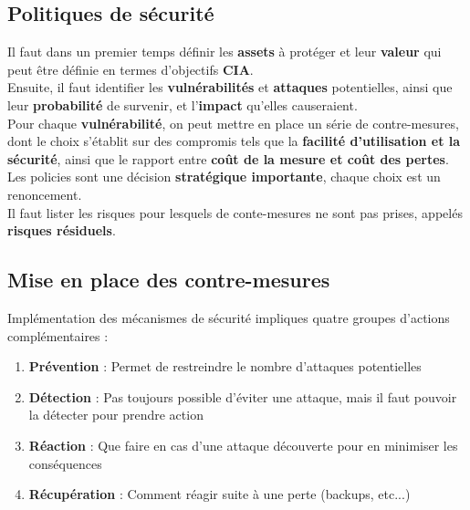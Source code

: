 \documentclass{report}
\begin{document}
		\subsection{Politiques de sécurité}

			Il faut dans un premier temps définir les \textbf{assets} à protéger et leur \textbf{valeur} qui peut être définie en termes d'objectifs \textbf{CIA}.\\

			Ensuite, il faut identifier les \textbf{vulnérabilités} et \textbf{attaques} potentielles, ainsi que leur \textbf{probabilité} de survenir, et l'\textbf{impact} qu'elles causeraient.\\

			Pour chaque \textbf{vulnérabilité}, on peut mettre en place un série de contre-mesures, dont le choix s'établit sur des compromis tels que la \textbf{facilité d'utilisation et la sécurité}, ainsi que le rapport entre \textbf{coût de la mesure et coût des pertes}.\\

			Les policies sont une décision \textbf{stratégique importante}, chaque choix est un renoncement.\\
			Il faut lister les risques pour lesquels de conte-mesures ne sont pas prises, appelés \textbf{risques résiduels}.\\

		\subsection{Mise en place des contre-mesures}

			Implémentation des mécanismes de sécurité impliques quatre groupes d'actions complémentaires : \\

			\begin{enumerate}
				\item \textbf{Prévention} : Permet de restreindre le nombre d'attaques potentielles
				\item \textbf{Détection} : Pas toujours possible d'éviter une attaque, mais il faut pouvoir la détecter pour prendre action
				\item \textbf{Réaction} : Que faire en cas d'une attaque découverte pour en minimiser les conséquences
				\item \textbf{Récupération} : Comment réagir suite à une perte (backups, etc...)\\
			\end{enumerate}
\end{document}
